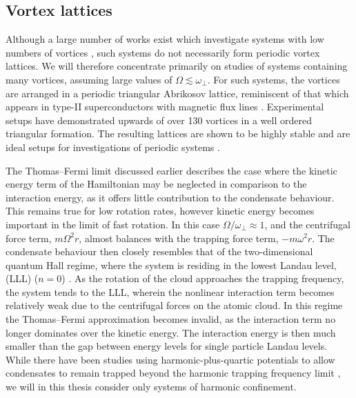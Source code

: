 \subsection{Vortex lattices}\label{sec:sec2_vtxlatt}

Although a large number of works exist which investigate systems with low numbers of vortices \cite{THS:Davies_2000,Vtx:Chevy_prl_2000,Vtx:Cooper_prl_2001,Vtx:Rosenbusch_prl_2002,Vtx:Ogawa_pra_2002,Vtx:Bretin_joptb_2003,Vtx:Madison_prl_2000,Vtx:Madison_jmo_2000,Vtx:Chevy_aoi_2001,Vtx:Madison_prl_2001,Vtx:Mottonen_jpcm_2002}, such systems do not necessarily form periodic vortex lattices. We will therefore concentrate primarily on studies of systems containing many vortices, assuming large values of $\Omega \lesssim \omega_\perp$. For such systems, the vortices are arranged in a periodic triangular Abrikosov lattice, reminiscent of that which appears in type-II superconductors with magnetic flux lines \cite{Vtx:AboShaeer_sci_2001}. Experimental setups have demonstrated upwards of over 130 vortices in a well ordered triangular formation. The resulting lattices are shown to be highly stable and are ideal setups for investigations of periodic systems \cite{Vtx:AboShaeer_sci_2001,Vtx:Engels_prl_2002}.

The Thomas--Fermi limit discussed earlier describes the case where the kinetic energy term of the Hamiltonian may be neglected in comparison to the interaction energy, as it offers little contribution to the condensate behaviour. This remains true for low rotation rates, however kinetic energy becomes important in the limit of fast rotation. In this case $\Omega/\omega_{\perp}\approx 1$, and the centrifugal force term, $m\Omega^2r$, almost balances with the trapping force term, $-m\omega^2r$. The condensate behaviour then closely resembles that of the two-dimensional quantum Hall regime, where the system is residing in the lowest Landau level, (LLL) ($n=0$) \cite{Vtx:Ho_prl_2001}.  As the rotation of the cloud approaches the trapping frequency, the system tends to the LLL, wherein the nonlinear interaction term becomes relatively weak due to the centrifugal forces on the atomic cloud. In this regime the Thomas--Fermi approximation becomes invalid, as the interaction term no longer dominates over the kinetic energy. The interaction energy is then much smaller than the gap between energy levels for single particle Landau levels. While there have been studies using harmonic-plus-quartic potentials to allow condensates to remain trapped beyond the harmonic trapping frequency limit \cite{BEC:Bretin_prl_2004,Vtx:Ghosh_pra_2004}, we will in this thesis consider only systems of harmonic confinement.

